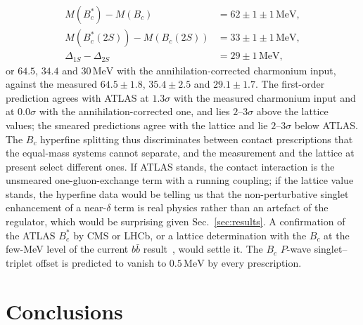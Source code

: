 \documentclass[10pt,twocolumn]{article}
\newcommand{\Bc}{B_c}
\newcommand{\Bcs}{B_c^*}
\newcommand{\bb}{b\bar b}
\newcommand{\MeV}{\,\mathrm{MeV}}
\begin{document}
\begin{align}
  M(\Bcs)-M(\Bc) &= 62\pm1\pm1\MeV, \\
  M(\Bcs(2S))-M(\Bc(2S)) &= 33\pm1\pm1\MeV, \\
  \Delta_{1S}-\Delta_{2S} &= 29\pm1\MeV,
\end{align}
or $64.5$, $34.4$ and $30\MeV$ with the annihilation-corrected charmonium input, against the measured $64.5\pm1.8$, $35.4\pm2.5$ and $29.1\pm1.7$.
The first-order prediction agrees with ATLAS at $1.3\sigma$ with the measured charmonium input and at $0.0\sigma$ with the annihilation-corrected one, and lies $2$--$3\sigma$ above the lattice values; the smeared predictions agree with the lattice and lie $2$--$3\sigma$ below ATLAS.
The $\Bc$ hyperfine splitting thus discriminates between contact prescriptions that the equal-mass systems cannot separate, and the measurement and the lattice at present select different ones.
If ATLAS stands, the contact interaction is the unsmeared one-gluon-exchange term with a running coupling; if the lattice value stands, the hyperfine data would be telling us that the non-perturbative singlet enhancement of a near-$\delta$ term is real physics rather than an artefact of the regulator, which would be surprising given Sec.~\ref{sec:results}.
A confirmation of the ATLAS $\Bcs$ by CMS or LHCb, or a lattice determination with the $\Bc$ at the few-MeV level of the current $\bb$ result~\cite{Hatton2021}, would settle it.
The $\Bc$ $P$-wave singlet--triplet offset is predicted to vanish to $0.5\MeV$ by every prescription.

\section{Conclusions}
\label{sec:conclusions}
\end{document}
